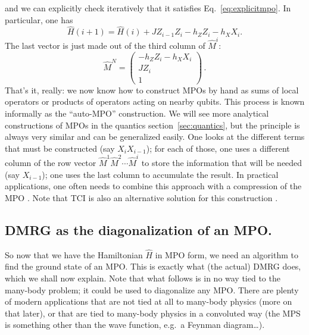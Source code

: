 \documentclass{SciPost}
\begin{document}
and we can explicitly check iteratively that it satisfies Eq.~\eqref{eq:explicitmpo}.  In particular, one has
\[
\hat H(i+1) = \hat H(i) + J Z_{i-1}Z_i -h_Z Z_i -h_X X_i.
\]
The last vector is just made out of the third column of $\hat M^i$:
\begin{equation}
\hat M^N =
\begin{pmatrix}
  -h_Z Z_i -h_X X_i \\
  J Z_i  \\
  1
\end{pmatrix}\,.
\end{equation}
That's it, really: we now know how to construct MPOs by hand as sums of local operators or products of operators acting on nearby qubits. 
This process is known informally as the ``auto-MPO'' construction. We will see more analytical constructions of MPOs in the quantics section~\ref{sec:quantics}, but the principle is always very similar and can be generalized easily. One looks at the different terms that must be constructed (say $X_i X_{i-1}$); for each of those, one uses a different column of the row vector $\hat M^1 \hat M^2 \cdots{}\hat M^i$ to store the information that will be needed (say $X_{i-1}$); one uses the last column to accumulate the result. In practical applications, one often needs to combine this approach with a compression of the MPO \cite{hubig2017}. Note that TCI is also an alternative solution for this construction \cite{nunez2025}.

\subsection{DMRG as the diagonalization of an MPO.}
So now that we have the Hamiltonian $\hat H$ in MPO form,
we need an algorithm to find the ground state of an MPO.
This is exactly what (the actual) DMRG does, which we shall now explain.
Note that what follows is in no way tied to the many-body
problem; it could be used to diagonalize any MPO.
There are plenty of modern applications that are not tied at all to many-body physics (more on that later), or that are tied to many-body physics in a convoluted way (the MPS is something other than the wave function, e.g.\ a Feynman diagram\dots).
\end{document}
